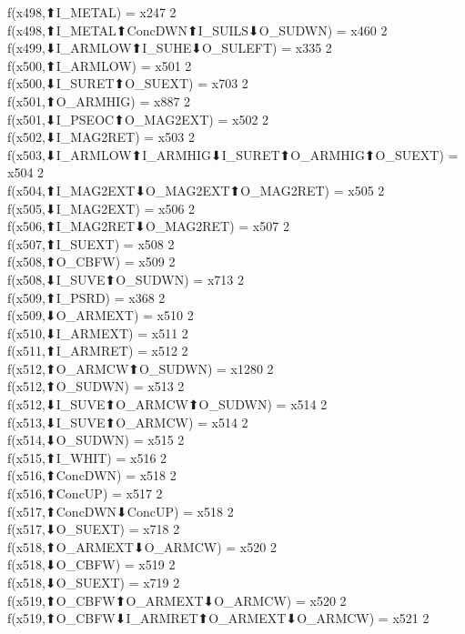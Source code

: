 f(x498,⬆I_METAL) = x247 {2} \\
f(x498,⬆I_METAL⬆ConcDWN⬆I_SUILS⬇O_SUDWN) = x460 {2} \\
f(x499,⬇I_ARMLOW⬆I_SUHE⬇O_SULEFT) = x335 {2} \\
f(x500,⬆I_ARMLOW) = x501 {2} \\
f(x500,⬇I_SURET⬆O_SUEXT) = x703 {2} \\
f(x501,⬆O_ARMHIG) = x887 {2} \\
f(x501,⬇I_PSEOC⬆O_MAG2EXT) = x502 {2} \\
f(x502,⬇I_MAG2RET) = x503 {2} \\
f(x503,⬇I_ARMLOW⬆I_ARMHIG⬇I_SURET⬆O_ARMHIG⬆O_SUEXT) = x504 {2} \\
f(x504,⬆I_MAG2EXT⬇O_MAG2EXT⬆O_MAG2RET) = x505 {2} \\
f(x505,⬇I_MAG2EXT) = x506 {2} \\
f(x506,⬆I_MAG2RET⬇O_MAG2RET) = x507 {2} \\
f(x507,⬆I_SUEXT) = x508 {2} \\
f(x508,⬆O_CBFW) = x509 {2} \\
f(x508,⬇I_SUVE⬆O_SUDWN) = x713 {2} \\
f(x509,⬆I_PSRD) = x368 {2} \\
f(x509,⬇O_ARMEXT) = x510 {2} \\
f(x510,⬇I_ARMEXT) = x511 {2} \\
f(x511,⬆I_ARMRET) = x512 {2} \\
f(x512,⬆O_ARMCW⬆O_SUDWN) = x1280 {2} \\
f(x512,⬆O_SUDWN) = x513 {2} \\
f(x512,⬇I_SUVE⬆O_ARMCW⬆O_SUDWN) = x514 {2} \\
f(x513,⬇I_SUVE⬆O_ARMCW) = x514 {2} \\
f(x514,⬇O_SUDWN) = x515 {2} \\
f(x515,⬆I_WHIT) = x516 {2} \\
f(x516,⬆ConcDWN) = x518 {2} \\
f(x516,⬆ConcUP) = x517 {2} \\
f(x517,⬆ConcDWN⬇ConcUP) = x518 {2} \\
f(x517,⬇O_SUEXT) = x718 {2} \\
f(x518,⬆O_ARMEXT⬇O_ARMCW) = x520 {2} \\
f(x518,⬇O_CBFW) = x519 {2} \\
f(x518,⬇O_SUEXT) = x719 {2} \\
f(x519,⬆O_CBFW⬆O_ARMEXT⬇O_ARMCW) = x520 {2} \\
f(x519,⬆O_CBFW⬇I_ARMRET⬆O_ARMEXT⬇O_ARMCW) = x521 {2} \\
